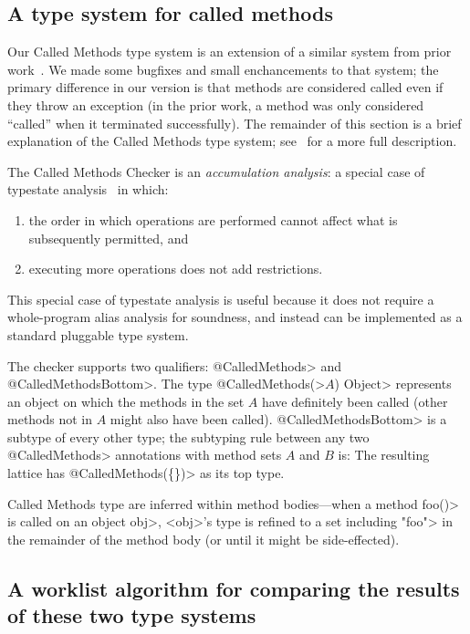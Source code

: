 \subsection{A type system for called methods}
\label{sec:called-methods}

Our Called Methods type system is an extension of a similar system
from prior work~\cite{kellogg20verifying}. We made some bugfixes and
small enchancements to that system; the primary difference in our
version is that methods are considered called even if they throw an exception
(in the prior work, a method was only considered ``called'' when it terminated
successfully). The remainder of this section is a brief explanation
of the Called Methods type system; see~\cite{kellogg20verifying} for
a more full description.

The Called Methods Checker is an \emph{accumulation analysis}: a special case
of typestate analysis~\cite{StromY86} in which:
\begin{enumerate}
\item the order in which operations are performed cannot affect what is
  subsequently permitted, and
\item executing more operations does not add restrictions.
\end{enumerate}
This special case of typestate analysis is useful because it does not
require a whole-program alias analysis for soundness, and instead
can be implemented as a standard pluggable type system.

The checker supports two qualifiers: \<@CalledMethods>
and \<@CalledMethodsBottom>. The type \<@CalledMethods(>$A$\<) Object>
represents an object on which the methods in the set $A$ have definitely
been called (other methods not in $A$ might also have been called).
\<@CalledMethodsBottom> is a subtype of every other type; the subtyping
rule between any two \<@CalledMethods> annotations with method sets $A$
and $B$ is:
The resulting lattice has \<@CalledMethods(\{\})> as its top type.

Called Methods type are inferred within method bodies---when a method
\<foo()> is called on an object \<obj>, <obj>'s type is refined to a
set including \<"foo"> in the remainder of the method body (or until
it might be side-effected).

\subsection{A worklist algorithm for comparing the results of these two type systems}
\label{sec:must-call-invoked}


